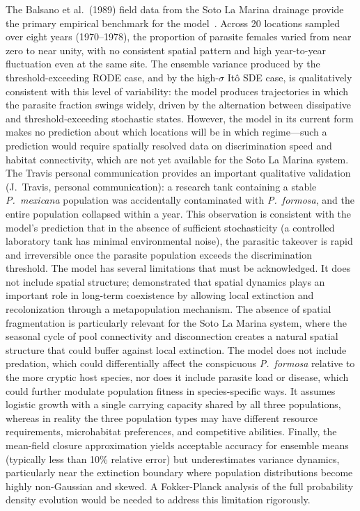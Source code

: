 \documentclass[12pt]{article}
\begin{document}
The Balsano et al.\ (1989) field data from the Soto La Marina drainage provide the primary empirical benchmark for the model~\citep{Balsano1989}.  Across 20 locations sampled over eight years (1970--1978), the proportion of parasite females varied from near zero to near unity, with no consistent spatial pattern and high year-to-year fluctuation even at the same site.  The ensemble variance produced by the threshold-exceeding RODE case, and by the high-$\sigma$ It\^{o} SDE case, is qualitatively consistent with this level of variability: the model produces trajectories in which the parasite fraction swings widely, driven by the alternation between dissipative and threshold-exceeding stochastic states.  However, the model in its current form makes no prediction about which locations will be in which regime---such a prediction would require spatially resolved data on discrimination speed and habitat connectivity, which are not yet available for the Soto La Marina system.  The Travis personal communication provides an important qualitative validation (J.~Travis, personal communication): a research tank containing a stable \textit{P.~mexicana} population was accidentally contaminated with \textit{P.~formosa}, and the entire population collapsed within a year.  This observation is consistent with the model's prediction that in the absence of sufficient stochasticity (a controlled laboratory tank has minimal environmental noise), the parasitic takeover is rapid and irreversible once the parasite population exceeds the discrimination threshold.  The model has several limitations that must be acknowledged.  It does not include spatial structure; \citet{Kokko2008} demonstrated that spatial dynamics plays an important role in long-term coexistence by allowing local extinction and recolonization through a metapopulation mechanism.  The absence of spatial fragmentation is particularly relevant for the Soto La Marina system, where the seasonal cycle of pool connectivity and disconnection creates a natural spatial structure that could buffer against local extinction.  The model does not include predation, which could differentially affect the conspicuous \textit{P.~formosa} relative to the more cryptic host species, nor does it include parasite load or disease, which could further modulate population fitness in species-specific ways.  It assumes logistic growth with a single carrying capacity shared by all three populations, whereas in reality the three population types may have different resource requirements, microhabitat preferences, and competitive abilities.  Finally, the mean-field closure approximation yields acceptable accuracy for ensemble means (typically less than 10\% relative error) but underestimates variance dynamics, particularly near the extinction boundary where population distributions become highly non-Gaussian and skewed.  A Fokker-Planck analysis of the full probability density evolution would be needed to address this limitation rigorously.
\end{document}
